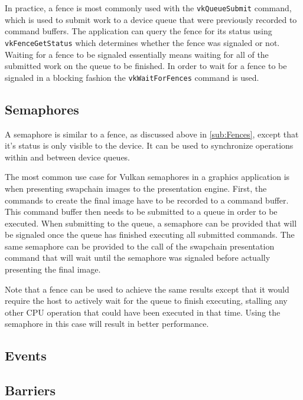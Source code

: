       In practice, a fence is most commonly used with the \lstinline{vkQueueSubmit} command, which is used to submit work to a device queue that were previously recorded to command buffers. The application can query the fence for its status using \lstinline{vkFenceGetStatus} which determines whether the fence was signaled or not. Waiting for a fence to be signaled essentially means waiting for all of the submitted work on the queue to be finished. In order to wait for a fence to be signaled in a blocking fashion the \lstinline{vkWaitForFences} command is used.

    \subsection{Semaphores}
    \label{sub:Semaphores}
      A semaphore is similar to a fence, as discussed above in \ref{sub:Fences}, except that it's status is only visible to the device. It can be used to synchronize operations within and between device queues.

      The most common use case for Vulkan semaphores in a graphics application is when presenting swapchain images to the presentation engine. First, the commands to create the final image have to be recorded to a command buffer. This command buffer then needs to be submitted to a queue in order to be executed. When submitting to the queue, a semaphore can be provided that will be signaled once the queue has finished executing all submitted commands. The same semaphore can be provided to the call of the swapchain presentation command that will wait until the semaphore was signaled before actually presenting the final image.

      Note that a fence can be used to achieve the same results except that it would require the host to actively wait for the queue to finish executing, stalling any other CPU operation that could have been executed in that time. Using the semaphore in this case will result in better performance.

    \subsection{Events}
    \label{sub:Events}
      \lipsum

    \subsection{Barriers}
    \label{sub:Barriers}
      \lipsum

